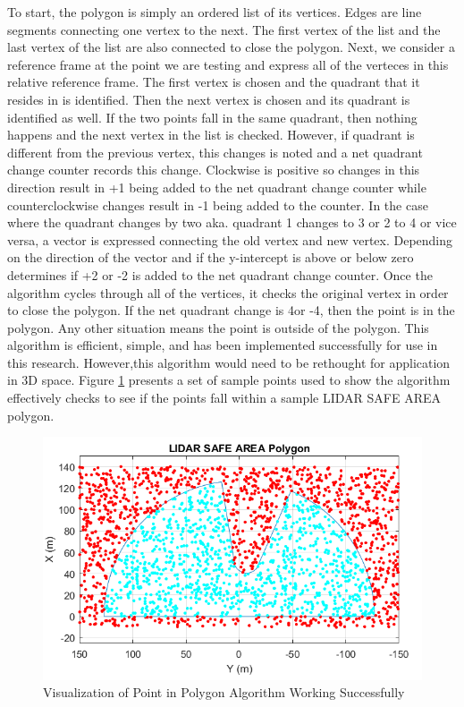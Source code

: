 \documentclass[12pt,onecolumn]{report}
\begin{document}
To start, the polygon is simply an ordered list of its vertices. Edges are line segments connecting one vertex to the next. The first vertex of the list and the last vertex of the list are also connected to close the polygon.   Next, we consider a reference frame at the point we are testing and express all of the verteces in this relative reference frame. The first vertex is chosen and the quadrant that it resides in is identified. Then the next vertex is chosen and its quadrant is identified as well. If the two points fall in the same quadrant, then nothing happens and the next vertex in the list is checked. However, if quadrant is different from the previous vertex, this changes is noted and a net quadrant change counter records this change. Clockwise is positive so changes in this direction result in +1 being added to the net quadrant change counter while counterclockwise changes result in -1 being added to the counter. In the case where the quadrant changes by two aka. quadrant 1 changes to 3 or 2 to 4 or vice versa, a vector is expressed connecting the old vertex and new vertex. Depending on the direction of the vector and if the y-intercept is above or below zero determines if +2 or -2 is added to the net quadrant change counter. Once the algorithm cycles through all of the vertices, it checks the original vertex in order to close the polygon. If the net quadrant change is 4or -4, then the point is in the polygon. Any other situation means the point is outside of the polygon. This algorithm is efficient, simple, and has been implemented successfully for use in this research. However,this algorithm would need to be rethought for application in 3D space. Figure \ref{fig:PointInPolygon} presents a set of sample points used to show the algorithm effectively checks to see if the points fall within a sample LIDAR SAFE AREA polygon.

\begin{figure}
	\centering
	\includegraphics[width=0.7\columnwidth]{Figs/PointInPolygon.png}
	\caption{\small Visualization of Point in Polygon Algorithm Working Successfully}  
	\label{fig:PointInPolygon}
\end{figure}
\end{document}
